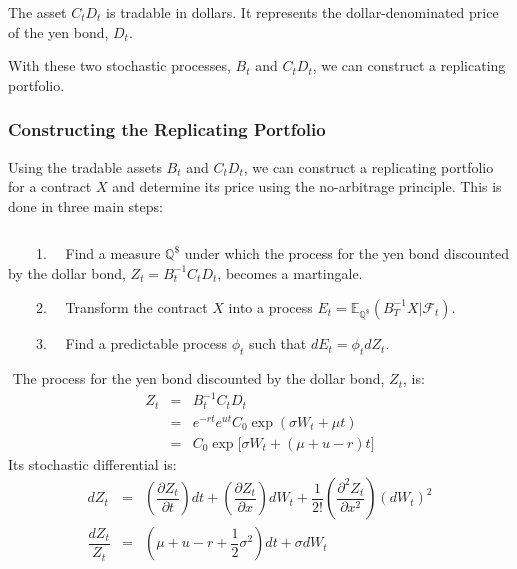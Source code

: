 \documentclass[uplatex,a4j,12pt,dvipdfmx]{jsarticle}
\begin{document}
${}$

The asset $C_{t} D_{t}$ is tradable in dollars. It represents the dollar-denominated price of the yen bond, $D_{t}$.

With these two stochastic processes, $B_{t}$ and $C_{t}D_{t}$, we can construct a replicating portfolio.

\subsubsection{Constructing the Replicating Portfolio}

Using the tradable assets $B_{t}$ and $C_{t}D_{t}$, we can construct a replicating portfolio for a contract $X$ and determine its price using the no-arbitrage principle. This is done in three main steps:

${}$

\ \ \ \ 1. \ \ Find a measure $\mathbb{Q}^{\$}$ under which the process for the yen bond discounted by the dollar bond, $Z_{t} = B^{-1}_{t} C_{t} D_{t}$, becomes a martingale.

\ \ \ \ 2. \ \ Transform the contract $X$ into a process $E_{t} = \mathbb{E}_{\mathbb{Q}^{\$}}(B_{T}^{-1}X|\mathcal{F}_{t})$.

\ \ \ \ 3. \ \ Find a predictable process $\phi_{t}$ such that $dE_{t}=\phi_{t} dZ_{t}$.

${}$
The process for the yen bond discounted by the dollar bond, $Z_{t}$, is:
%
%
\begin{eqnarray*}
	Z_{t}
	&=&
	B^{-1}_{t} C_{t} D_{t}
	\\ &=&
	e^{-rt} e^{ut} C_{0} \exp (\sigma W_{t} + \mu t )
	\\ &=&
	C_{0} \exp \big[ \sigma W_{t} + (\mu + u - r)t \big]
\end{eqnarray*}
%
%
Its stochastic differential is:
%
%
\begin{eqnarray*}
	d Z_{t}
	&=&
	\left(
	\dfrac{\partial Z_{t}}{\partial t}
	\right)
	dt
	+
	\left(
	\dfrac{\partial Z_{t}}{\partial x}
	\right)
	d W_{t}
	+
	\dfrac{1}{2!}
	\left(
	\dfrac{\partial^{2} Z_{t}}{\partial x^{2}}
	\right)
	(d W_{t})^{2}
	\\
	\dfrac{dZ_{t}}{Z_{t}}
	&=&
	\left(
	\mu + u - r + \dfrac{1}{2} \sigma^{2}
	\right)
	dt
	+
	\sigma d W_{t}
\end{eqnarray*}
%
%
\end{document}
